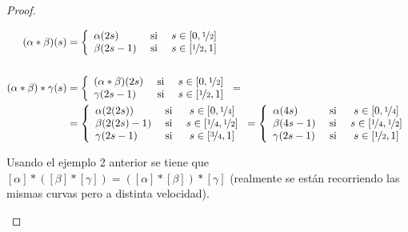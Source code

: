 \begin{teo}
\begin{proof}
\begin{enumerate}
\begin{align*}
                (\alpha\ast\beta)(s) &= \left\{
                    \begin{array}{l c c}
                        \alpha(2s) & \text{ si } & s \in [0,\nicefrac{1}{2}]\\
                        \beta(2s-1) & \text{ si } & s \in [\nicefrac{1}{2},1]\\
                    \end{array}
                \right.\\\\
                (\alpha \ast\beta)\ast\gamma(s) &= \left\{
                    \begin{array}{l c c}
                        (\alpha\ast\beta)(2s) & \text{ si } & s \in [0,\nicefrac{1}{2}]\\
                        \gamma(2s-1) & \text{ si } & s \in [\nicefrac{1}{2},1]\\
                    \end{array}
                \right. =\\
                &= \left\{
                    \begin{array}{l c c}
                        \alpha(2(2s)) & \text{ si } & s \in [0,\nicefrac{1}{4}]\\
                        \beta(2(2s)-1) & \text{ si } & s \in [\nicefrac{1}{4},\nicefrac{1}{2}]\\
                        \gamma(2s-1) & \text{ si } & s \in [\nicefrac{3}{4},1]\\
                    \end{array}
                \right. = \left\{
                    \begin{array}{l c c}
                        \alpha(4s) & \text{ si } & s \in [0,\nicefrac{1}{4}]\\
                        \beta(4s-1) & \text{ si } & s \in [\nicefrac{1}{4},\nicefrac{1}{2}]\\
                        \gamma(2s-1) & \text{ si } & s \in [\nicefrac{1}{2},1]\\
                    \end{array}
                \right.
            \end{align*}

            Usando el ejemplo 2 anterior se tiene que $[\alpha] \ast ([\beta] \ast [\gamma]) = ([\alpha] \ast [\beta]) \ast [\gamma]$ (realmente se están recorriendo las mismas curvas pero a distinta velocidad).



\end{enumerate}
\end{proof}
\end{teo}
